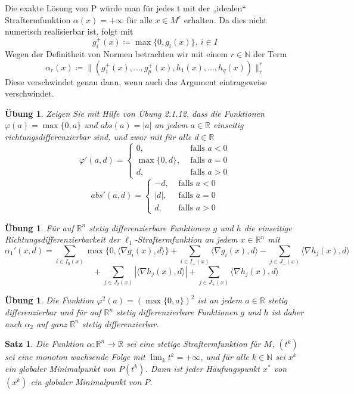 \documentclass[11pt]{scrreprt}
\newcounter{thm}
\theoremstyle{thmstyle}
\numberwithin{thm}{section}
\newtheorem{satz}[thm]{Satz}
\newtheorem{uebung}[thm]{Übung}
\begin{document}
Die exakte Lösung von P würde man für jedes t mit der „idealen“ Straftermfunktion $\alpha(x) =  +\infty$ für alle $x \in M^c$ erhalten. Da dies nicht numerisch realisierbar ist, folgt mit
	$$ g_i^+(x) \coloneqq \max \{ 0, g_i(x) \}, ~ i \in I $$
Wegen der Definitheit von Normen betrachten wir mit einem $r \in \mathbb{N}$ der Term
$$ \alpha_r(x) \coloneqq \| (g_1^+(x), \dotsc, g_p^+(x), h_1(x), \dotsc, h_q(x)) \|_r^r $$
Diese verschwindet genau dann, wenn auch das Argument eintragsweise verschwindet.

\begin{uebung}
	Zeigen Sie mit Hilfe von Übung 2.1.12, dass die Funktionen $\varphi(a) = \max \{0, a\}$ und $abs(a) = |a|$ an jedem $a \in \mathbb{R}$ einseitig richtungsdifferenzierbar sind, und zwar mit für alle $d \in \mathbb{R}$ 
	$$ \varphi'(a, d) = \begin{cases}
		0, & \text{ falls } a < 0 \\
		\max \{ 0, d \}, & \text{ falls } a = 0 \\ d, & \text{ falls } a > 0
	\end{cases} $$
	$$ abs'(a, d) = \begin{cases}
		-d, & \text{ falls } a < 0 \\ |d|, & \text{ falls } a = 0 \\ d, & \text{ falls } a > 0
	\end{cases} $$
\end{uebung}

\begin{uebung}
	Für auf $\mathbb{R}^n$ stetig differenzierbare Funktionen $g$ und $h$ die einseitige Richtungsdifferenzierbarkeit der $\ell_1$-Straftermfunktion an jedem $x \in \mathbb{R}^n$ mit
	$$ \alpha_1'(x, d) = \sum_{i \in I_0(x)} \max \{ 0, \langle \nabla g_i(x), d \rangle \} + \sum_{i \in I_+(x)} \langle \nabla g_i(x), d \rangle - \sum_{j \in J_{-}(x)} \langle \nabla h_j(x), d \rangle $$
	$$  ~\hspace{3cm} + \sum_{j \in J_0(x)} |\langle \nabla h_j(x), d \rangle | + \sum_{j \in J_{+}(x)} \langle \nabla h_j(x), d \rangle $$
\end{uebung}

\begin{uebung}
	Die Funktion $\varphi^2(a) = (\max\{0, a\})^2$ ist an jedem $a \in \mathbb{R}$ stetig differenzierbar und für auf $\mathbb{R}^n$ stetig differenzierbare Funktionen $g$ und $h$ ist daher auch $\alpha_2$ auf ganz $\mathbb{R}^n$ stetig differenzierbar.
\end{uebung}

\begin{satz}
	Die Funktion $\alpha \colon \mathbb{R}^n \rightarrow \mathbb{R}$ sei eine stetige Straftermfunktion für $M$, $(t^k)$ sei eine monoton wachsende Folge mit $\lim_k t^k = +\infty$, und für alle $k \in \mathbb{N}$ sei $x^k$ ein globaler Minimalpunkt von $P(t^k)$. Dann ist jeder Häufungspunkt $x^*$ von $(x^k)$ ein globaler Minimalpunkt von $P$.
\end{satz}
\end{document}
